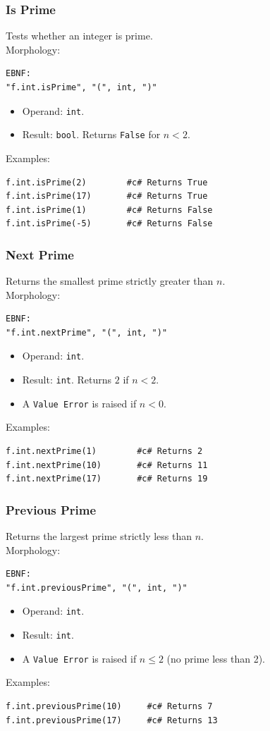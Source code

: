 \subsubsection{Is Prime}
Tests whether an integer is prime. \\
Morphology:
\begin{verbatim}
EBNF:
"f.int.isPrime", "(", int, ")"
\end{verbatim}
\begin{itemize}
\item Operand: \texttt{int}.
\item Result: \texttt{bool}. Returns \texttt{False} for $n < 2$.
\end{itemize}
Examples:
\begin{verbatim}
f.int.isPrime(2)        #c# Returns True
f.int.isPrime(17)       #c# Returns True
f.int.isPrime(1)        #c# Returns False
f.int.isPrime(-5)       #c# Returns False
\end{verbatim}

\subsubsection{Next Prime}
Returns the smallest prime strictly greater than $n$. \\
Morphology:
\begin{verbatim}
EBNF:
"f.int.nextPrime", "(", int, ")"
\end{verbatim}
\begin{itemize}
\item Operand: \texttt{int}.
\item Result: \texttt{int}. Returns $2$ if $n < 2$.
\item A \texttt{Value Error} is raised if $n < 0$.
\end{itemize}
Examples:
\begin{verbatim}
f.int.nextPrime(1)        #c# Returns 2
f.int.nextPrime(10)       #c# Returns 11
f.int.nextPrime(17)       #c# Returns 19
\end{verbatim}

\subsubsection{Previous Prime}
Returns the largest prime strictly less than $n$. \\
Morphology:
\begin{verbatim}
EBNF:
"f.int.previousPrime", "(", int, ")"
\end{verbatim}
\begin{itemize}
\item Operand: \texttt{int}.
\item Result: \texttt{int}.
\item A \texttt{Value Error} is raised if $n \leq 2$ (no prime less than 2).
\end{itemize}
Examples:
\begin{verbatim}
f.int.previousPrime(10)     #c# Returns 7
f.int.previousPrime(17)     #c# Returns 13
\end{verbatim}

